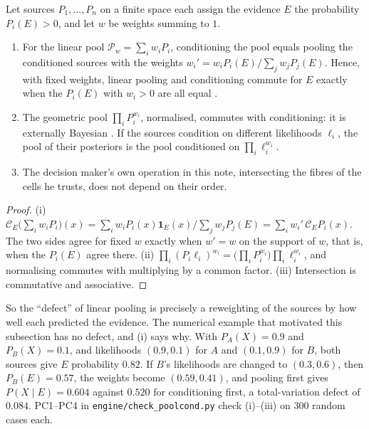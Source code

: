 \documentclass[11pt]{article}
\theoremstyle{definition}\newtheorem{definition}[theorem]{Definition}\newtheorem{remark}[theorem]{Remark}\newtheorem{example}[theorem]{Example}\newtheorem{problem}[theorem]{Open problem}\crefname{problem}{Problem}{Problems}
\begin{document}
\begin{proposition}\label{prop:poolcond}
Let sources $P_1,\dots,P_n$ on a finite space each assign the evidence $E$ the probability $P_i(E)>0$, and let $w$ be weights summing to $1$.
\begin{enumerate}
\item[(i)] For the linear pool $\mathcal P_w=\sum_iw_iP_i$, conditioning the pool equals pooling the conditioned sources with the weights $w_i'=w_iP_i(E)/\sum_jw_jP_j(E)$. Hence, with fixed weights, linear pooling and conditioning commute for $E$ exactly when the $P_i(E)$ with $w_i>0$ are all equal \cite{Stone1961,GenestZidek1986}.
\item[(ii)] The geometric pool $\prod_iP_i^{w_i}$, normalised, commutes with conditioning: it is externally Bayesian \cite{GenestMcConwaySchervish1986}. If the sources condition on different likelihoods $\ell_i$, the pool of their posteriors is the pool conditioned on $\prod_i\ell_i^{w_i}$.
\item[(iii)] The decision maker's own operation in this note, intersecting the fibres of the cells he trusts, does not depend on their order.
\end{enumerate}
\end{proposition}

\begin{proof}
(i) $\mathcal C_E\big(\sum_iw_iP_i\big)(x)=\sum_iw_iP_i(x)\mathbf 1_E(x)/\sum_jw_jP_j(E)=\sum_iw_i'\,\mathcal C_EP_i(x)$. The two sides agree for fixed $w$ exactly when $w'=w$ on the support of $w$, that is, when the $P_i(E)$ agree there. (ii) $\prod_i(P_i\ell_i)^{w_i}=\big(\prod_iP_i^{w_i}\big)\prod_i\ell_i^{w_i}$, and normalising commutes with multiplying by a common factor. (iii) Intersection is commutative and associative.
\end{proof}

So the ``defect'' of linear pooling is precisely a reweighting of the sources by how well each predicted the evidence. The numerical example that motivated this subsection has no defect, and (i) says why. With $P_A(X)=0.9$ and $P_B(X)=0.1$, and likelihoods $(0.9,0.1)$ for $A$ and $(0.1,0.9)$ for $B$, both sources give $E$ probability $0.82$. If $B$'s likelihoods are changed to $(0.3,0.6)$, then $P_B(E)=0.57$, the weights become $(0.59,0.41)$, and pooling first gives $P(X\mid E)=0.604$ against $0.520$ for conditioning first, a total-variation defect of $0.084$. PC1--PC4 in \texttt{engine/check\_poolcond.py} check (i)--(iii) on $300$ random cases each.
\end{document}
